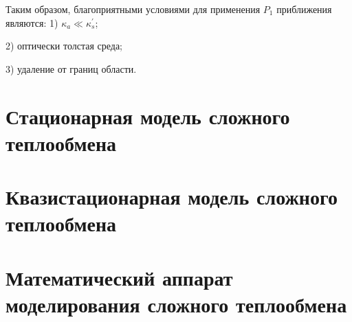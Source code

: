 Таким образом, благоприятными условиями для применения $P_{1}$ приближения являются:
1) $\kappa_{a} \ll \kappa_{s}^{\prime}$;

2) оптически толстая среда;

3) удаление от границ области.

\FloatBarrier

\section{Стационарная модель сложного теплообмена}\label{sec:ch1/sec3}
\section{Квазистационарная модель сложного теплообмена}\label{sec:ch1/sec4}
\section{Математический аппарат моделирования сложного теплообмена}\label{sec:ch1/sec5}
